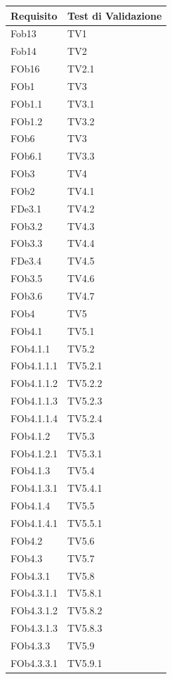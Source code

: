 \begin{longtable}{|p{2.5cm}|p{5cm}|}
\hline
\textbf{Requisito} & \textbf{Test di Validazione} \\
\hline
Fob13 & TV1\\
\hline
Fob14 & TV2\\
\hline
FOb16 & TV2.1\\
\hline
FOb1 & TV3\\
\hline
FOb1.1 & TV3.1\\
\hline
FOb1.2 & TV3.2\\
\hline
FOb6& TV3\\
\hline
FOb6.1 & TV3.3\\
\hline
FOb3 & TV4\\
\hline
FOb2 & TV4.1\\
\hline
FDe3.1 & TV4.2\\
\hline
FOb3.2 & TV4.3\\
\hline
FOb3.3 & TV4.4\\
\hline
FDe3.4 & TV4.5\\
\hline
FOb3.5 & TV4.6\\
\hline
FOb3.6 & TV4.7\\
\hline
FOb4 & TV5\\
\hline
FOb4.1 & TV5.1\\
\hline
FOb4.1.1 & TV5.2\\
\hline
FOb4.1.1.1 & TV5.2.1\\
\hline
FOb4.1.1.2 & TV5.2.2\\
\hline
FOb4.1.1.3 & TV5.2.3\\
\hline
FOb4.1.1.4 & TV5.2.4\\
\hline
FOb4.1.2 & TV5.3\\
\hline
FOb4.1.2.1 & TV5.3.1\\
\hline
FOb4.1.3 & TV5.4\\
\hline
FOb4.1.3.1 & TV5.4.1\\
\hline
FOb4.1.4 & TV5.5\\
\hline
FOb4.1.4.1 & TV5.5.1\\
\hline
FOb4.2 & TV5.6\\
\hline
FOb4.3 & TV5.7\\
\hline
FOb4.3.1 & TV5.8\\ %
\hline
FOb4.3.1.1 & TV5.8.1\\
\hline
FOb4.3.1.2 & TV5.8.2\\
\hline
FOb4.3.1.3 & TV5.8.3\\
\hline
FOb4.3.3 & TV5.9\\ %
\hline
FOb4.3.3.1 & TV5.9.1\\

\end{longtable}
